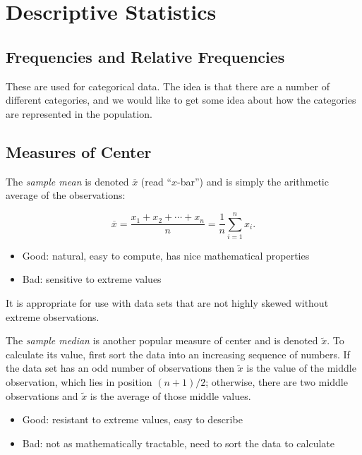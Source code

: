 \documentclass[captions=tableheading]{scrbook}
\begin{document}
\section{Descriptive Statistics}
\label{sec-3-3}

\label{sec:Descriptive-Statistics}
\subsection{Frequencies and Relative Frequencies}
\label{sec-3-3-1}

\label{sub:Frequencies-and-Relative}

These are used for categorical data. The idea is that there are a number of different categories, and we would like to get some idea about how the categories are represented in the population. 
\subsection{Measures of Center}
\label{sec-3-3-2}

\label{sub:Measures-of-Center}

The \emph{sample mean} is denoted \(\overline{x}\) (read ``\(x\)-bar'') and is simply the arithmetic average of the observations:

\begin{equation} 
\overline{x}=\frac{x_{1}+x_{2}+\cdots+x_{n}}{n}=\frac{1}{n}\sum_{i=1}^{n}x_{i}.
\end{equation}

\begin{itemize}
\item Good: natural, easy to compute, has nice mathematical properties
\item Bad: sensitive to extreme values
\end{itemize}

It is appropriate for use with data sets that are not highly skewed without extreme observations.

The \emph{sample median} is another popular measure of center and is denoted \(\tilde{x}\). To calculate its value, first sort the data into an increasing sequence of numbers. If the data set has an odd number of observations then \(\tilde{x}\) is the value of the middle observation, which lies in position \((n+1)/2\); otherwise, there are two middle observations and \(\tilde{x}\) is the average of those middle values.

\begin{itemize}
\item Good: resistant to extreme values, easy to describe
\item Bad: not as mathematically tractable, need to sort the data to calculate
\end{itemize}
\end{document}
